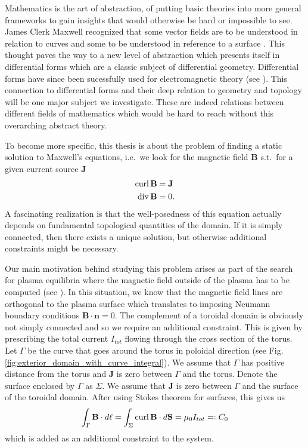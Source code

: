 \documentclass[../master_thesis.tex]{subfiles}
\begin{document}
Mathematics is the art of abstraction, of putting basic theories into more 
general frameworks to gain insights that would otherwise be hard or 
impossible to see. James Clerk Maxwell recognized that some
vector fields are to be understood in relation to curves 
and some to be understood in reference to a surface \cite[p.69]{arnold}. 
This thought paves the way to a new level of abstraction
which presents itself in differential forms which are a classic 
subject of differential geometry. Differential forms have since been sucessfully
used for electromagnetic theory (see \cite{differential_forms_electromagnetism}).
This connection to differential forms and their deep relation to geometry and topology
will be one major subject we investigate. These are indeed relations between different 
fields of mathematics which would be hard to reach without this overarching abstract theory.

To become more specific, this thesis is about the problem of finding a static solution to Maxwell's equations,
i.e.~we look for the magnetic field $\mathbf{B}$ s.t.~for a given current source 
$\mathbf{J}$ 
\begin{align*}
    \operatorname{curl} \mathbf{B} &= \mathbf{J} 
    \\ \operatorname{div} \mathbf{B} &= 0.
\end{align*}
A fascinating realization is that the well-posedness of this equation actually 
depends on fundamental topological quantities of the domain. If it is simply 
connected, then there exists a unique solution, but otherwise additional constraints 
might be necessary.

Our main motivation behind studying this problem arises as part of the search for plasma equilibria where 
the magnetic field outside of the plasma has to be computed (see \cite{merkel1986}).
In this situation, we know that the magnetic field lines are orthogonal to the plasma surface
which translates to imposing Neumann boundary conditions 
$\mathbf{B} \cdot \mathbf{n} = 0$. The complement of a toroidal domain is obviously not simply connected and so 
we require an additional constraint. This is given by prescribing the total 
current  $I_{tot}$ flowing through the cross section of the torus.
Let $\Gamma$ be the curve that goes around the torus 
in poloidal direction (see Fig.\,\ref{fig:exterior_domain_with_curve_integral}). 
We assume that $\Gamma$ has positive distance from the torus and 
$\mathbf{J}$ is zero between $\Gamma$ and the torus.
Denote the surface enclosed by $\Gamma$ as $\Sigma$.
We assume that $\mathbf{J}$ is zero between $\Gamma$ and the surface of the toroidal domain.
After using Stokes theorem 
for surfaces, this gives us 
\begin{align*}
    \int_\Gamma \mathbf{B}\cdot d\ell= \int_\Sigma \operatorname{curl} \mathbf{B} \cdot d\mathbf{S} 
    = \mu_0 I_{tot} =\vcentcolon C_0
\end{align*}
which is added as an additional constraint to the system.
\end{document}
